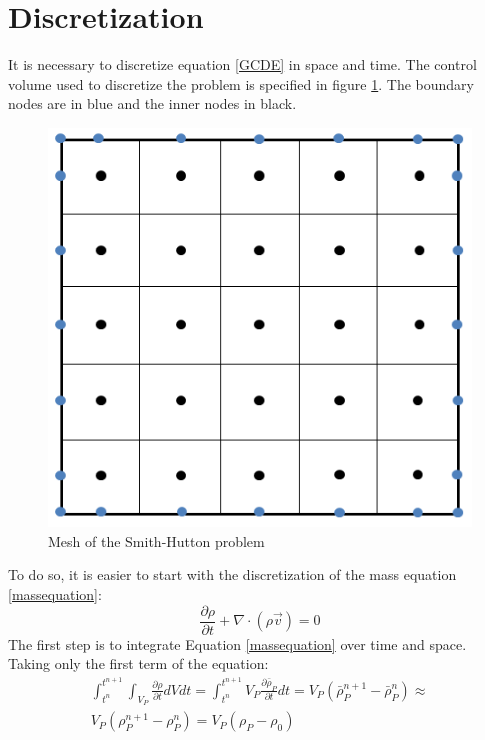 \section{Discretization}
It is necessary to discretize equation \ref{GCDE} in space and time. The control volume used to discretize the problem is specified in figure \ref{SHmesh}. The boundary nodes are in blue and the inner nodes in black.
\begin{figure}
	\centering
	\includegraphics[scale=0.6]{SmithHutton/mesh}
	\caption{Mesh of the Smith-Hutton problem}
	\label{SHmesh}
\end{figure}
To do so, it is easier to start with the discretization of the mass equation \ref{massequation}:
\begin{equation}
\frac{\partial\rho}{\partial t}+\nabla\cdot\left(\rho\vec{v}\right)=0
\label{massequation}
\end{equation}
The first step is to integrate Equation \ref{massequation} over time and space. Taking only the first term of the equation:
\begin{equation}
\begin{aligned}
\int_{t^{n}}^{t^{n+1}}\int_{V_{P}}^{}\frac{\partial\rho}{\partial t}dVdt=\int_{t^{n}}^{t^{n+1}}V_{P}\frac{\partial\bar{\rho}_{P}}{\partial t}dt=V_{P}\left(\bar{\rho}_{P}^{n+1}-\bar{\rho}_{P}^{n}\right)\approx \\
V_{P}\left(\rho_{P}^{n+1}-\rho_{P}^{n}\right)=V_{P}\left(\rho_{P}-\rho_{0}\right)
\end{aligned}
\end{equation}

